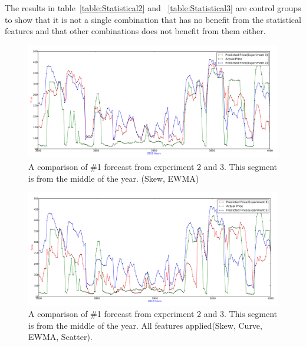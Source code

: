 The results in table~\ref{table:Statistical2} and ~\ref{table:Statistical3} are control groups to show that it is not a single combination that has no benefit from the statistical features and that other combinations does not benefit from them either.

\begin{figure}[H]
\centering
\includegraphics[width=\linewidth,natwidth=898,natheight=587]{billeder/PriceExperimentalAnalysis/X2_X3_3800_4000.png}
\caption{A comparison of \#1 forecast from experiment 2 and 3. This segment is from the middle of the year. (Skew, EWMA)}
\label{fig:X2_X3_3800_4000}
\end{figure}

\begin{figure}[H]
\centering
\includegraphics[width=\linewidth,natwidth=898,natheight=587]{billeder/PriceExperimentalAnalysis/X2_X3_AllFeatures_3800_4000.png}
\caption{A comparison of \#1 forecast from experiment 2 and 3. This segment is from the middle of the year. All features applied(Skew, Curve, EWMA, Scatter).}
\label{fig:X2_X3_AllParameters_3800_4000}
\end{figure}


